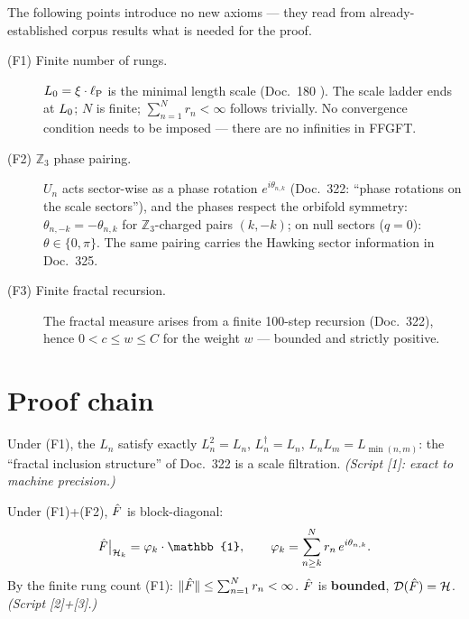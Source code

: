 The following points introduce no new axioms — they read from
already-established corpus results what is needed for the proof.

\begin{description}
  \item[(F1) Finite number of rungs.]
    $L_0 = \xi\cdot\ell_{\mathrm{P}}$ is the minimal length scale (Doc.~180 \K).
    The scale ladder ends at $L_0$; $N$ is finite;
    $\sum_{n=1}^N r_n < \infty$ follows trivially.
    No convergence condition needs to be imposed —
    there are no infinities in FFGFT.

  \item[(F2) $\mathbb{Z}_3$ phase pairing.]
    $U_n$ acts sector-wise as a phase rotation $e^{i\theta_{n,k}}$
    (Doc.~322: ``phase rotations on the scale sectors''),
    and the phases respect the orbifold symmetry:
    $\theta_{n,-k} = -\theta_{n,k}$ for $\mathbb{Z}_3$-charged pairs $(k,-k)$;
    on null sectors ($q=0$): $\theta \in \{0,\pi\}$.
    The same pairing carries the Hawking sector information in Doc.~325.

  \item[(F3) Finite fractal recursion.]
    The fractal measure arises from a finite 100-step recursion
    (Doc.~322), hence $0 < c \le w \le C$ for the weight $w$ —
    bounded and strictly positive.
\end{description}

\section{Proof chain}

\begin{tcolorbox}[proofbox, title={Lemma 1 — Filtration realises the Doc.-322 axioms \B}]
  Under (F1), the $L_n$ satisfy exactly $L_n^2 = L_n$, $L_n^\dagger = L_n$,
  $L_nL_m = L_{\min(n,m)}$: the ``fractal inclusion structure'' of Doc.~322
  is a scale filtration.
  \emph{(Script [1]: exact to machine precision.)}
\end{tcolorbox}

\begin{tcolorbox}[proofbox, title={Theorem 2 — Diagonal form and boundedness \B}]
  Under (F1)+(F2), $\hat{F}$ is block-diagonal:
  \[
    \Fhat\big|_{\Hcal_k} = \varphi_k \cdot \mathbb{1},
    \qquad
    \varphi_k = \sum_{n \ge k}^{N} r_n\, e^{i\theta_{n,k}}.
  \]
  By the finite rung count (F1):
  $\|\hat{F}\| \le \sum_{n=1}^{N} r_n < \infty$.
  $\hat{F}$ is \textbf{bounded}, $\mathcal{D}(\hat{F}) = \mathcal{H}$.
  \emph{(Script [2]+[3].)}
\end{tcolorbox}

